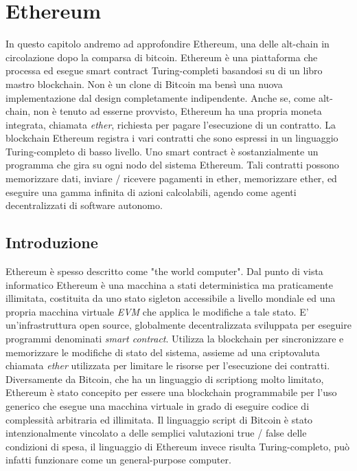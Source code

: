 
\chapter{Ethereum}
\label{bitcoin-chapter}
In questo capitolo andremo ad approfondire Ethereum, una delle alt-chain in circolazione dopo la comparsa di bitcoin. Ethereum è una piattaforma che processa ed esegue smart contract Turing-completi basandosi su di un libro mastro blockchain. Non è un clone di Bitcoin ma bensì una nuova implementazione dal design completamente indipendente. Anche se, come alt-chain, non è tenuto ad esserne provvisto, Ethereum ha una propria moneta integrata, chiamata \textit{ether}, richiesta per pagare l'esecuzione di un contratto. La blockchain Ethereum registra i vari contratti che sono espressi in un linguaggio Turing-completo di basso livello. Uno smart contract è sostanzialmente un programma che gira su ogni nodo del sistema Ethereum. Tali contratti possono memorizzare dati, inviare / ricevere pagamenti in ether, memorizzare ether, ed eseguire una gamma infinita di azioni calcolabili, agendo come agenti decentralizzati di software autonomo.

\section{Introduzione}
Ethereum è spesso descritto come "the world computer". Dal punto di vista informatico Ethereum è una macchina a stati deterministica ma praticamente illimitata, costituita da uno stato sigleton accessibile a livello mondiale ed una propria macchina virtuale \textit{EVM} che applica le modifiche a tale stato. E' un'infrastruttura open source, globalmente decentralizzata sviluppata per eseguire programmi denominati \textit{smart contract}. Utilizza la blockchain per sincronizzare e memorizzare le modifiche di stato del sistema, assieme ad una criptovaluta chiamata \textit{ether} utilizzata per limitare le risorse per l'esecuzione dei contratti. 
Diversamente da Bitcoin, che ha un linguaggio di scriptiong molto limitato, Ethereum è stato concepito per essere una blockchain programmabile per l'uso generico che esegue una macchina virtuale in grado di eseguire codice di complessità arbitraria ed illimitata. Il linguaggio script di Bitcoin è stato intenzionalmente vincolato a delle semplici valutazioni true / false delle condizioni di spesa, il linguaggio di Ethereum invece risulta Turing-completo, può infatti funzionare come un general-purpose computer.

